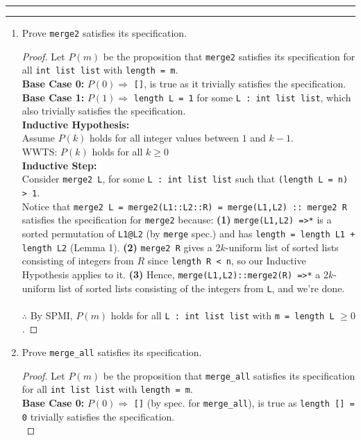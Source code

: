 \documentclass[11pt]{article}
\newcommand{\question}[2] {\vspace{.25in} \hrule\vspace{0.5em}
\noindent{\bf #1: #2} \vspace{0.5em}
\hrule \vspace{.10in}}
\begin{document}
\question{5}{Specifications and Proofs}
\begin{enumerate}
\item Prove \verb|merge2| satisfies its specification.
\begin{proof}
Let $P(m)$ be the proposition that \verb|merge2| satisfies its specification for all \verb|int list list| with \verb|length = m|.\\
\textbf{Base Case 0:} $P(0) \Rightarrow$ \verb|[]|, is true as it trivially satisfies the specification.\\
\textbf{Base Case 1:} $P(1) \Rightarrow$ \verb|length L = 1| for some \verb|L : int list list|, which also trivially satisfies the specification.\\
\textbf{Inductive Hypothesis:}\\
 Assume $P(k)$ holds for all integer values between $1$ and $k-1$.\\
WWTS: $P(k)$ holds for all $k \geq 0$\\
\textbf{Inductive Step:} \\
Consider \verb|merge2 L|, for some \verb|L : int list list| such that \verb|(length L = n) > 1|.\\
Notice that \verb|merge2 L = merge2(L1::L2::R) = merge(L1,L2) :: merge2 R| satisfies the specification for \verb|merge2| because: \textbf{(1)} \verb|merge(L1,L2) =>*| is a sorted permutation of \verb|L1@L2| (by \verb|merge| spec.) and has \verb|length = length L1 + length L2| (Lemma 1).  \textbf{(2)} \verb|merge2 R| gives a 2$k$-uniform list of sorted lists consisting of integers from $R$ since \verb|length R < n|, so our Inductive Hypothesis applies to it.  \textbf{(3)} Hence, \verb|merge(L1,L2)::merge2(R) =>*| a 2$k$-uniform list of sorted lists consisting of the integers from \verb|L|, and we're done.\\\\
$\therefore$ By SPMI, $P(m)$ holds for all \verb|L : int list list| with \verb|m = length L| $\geq 0$.
\end{proof}
\item Prove \verb|merge_all| satisfies its specification.
\begin{proof}
Let $P(m)$ be the proposition that \verb|merge_all| satisfies its specification for all \verb|int list list| with \verb|length = m|.\\
\textbf{Base Case 0:} $P(0) \Rightarrow$ \verb|[]| (by spec. for \verb|merge_all|), is true as \verb|length [] = 0| trivially satisfies the specification.\\

\end{proof}
\end{enumerate}
\end{document}
